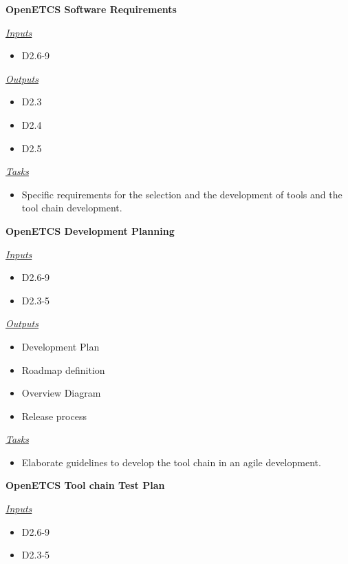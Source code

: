 \documentclass{template/openetcs_article}
\begin{document}
\begin{description}
\item \textbf{OpenETCS Software Requirements}

\underline{\textit{Inputs}}
\begin{itemize}
\item D2.6-9
\end{itemize}


\underline{\textit{Outputs}}
\begin{itemize}
\item D2.3
\item D2.4
\item D2.5
\end{itemize}


\underline{\textit{Tasks}}
\begin{itemize}
\item Specific requirements for the selection and the development of
  tools and the tool chain development.
\end{itemize}


\item \textbf{OpenETCS Development Planning}

\underline{\textit{Inputs}}
\begin{itemize}
\item D2.6-9
\item D2.3-5
\end{itemize}


\underline{\textit{Outputs}}
\begin{itemize}
\item Development Plan
\item Roadmap definition
\item Overview Diagram
\item Release process
\end{itemize}


\underline{\textit{Tasks}}
\begin{itemize}
\item Elaborate guidelines to develop the tool chain in an agile
  development.
\end{itemize}

\item \textbf{OpenETCS Tool chain Test Plan}

\underline{\textit{Inputs}}
\begin{itemize}
\item D2.6-9
\item D2.3-5
\end{itemize}



\end{description}
\end{document}
